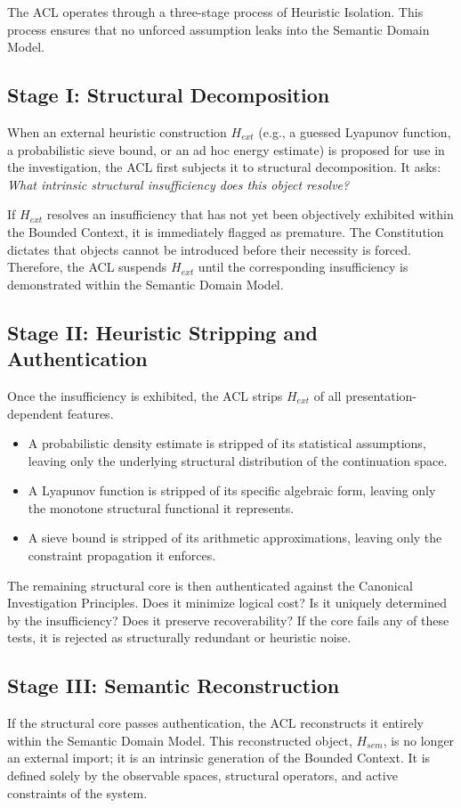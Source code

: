 \documentclass[12pt,openany]{extbook}
\theoremstyle{plain}
\theoremstyle{definition}
\begin{document}
The ACL operates through a three-stage process of Heuristic Isolation. This process ensures that no unforced assumption leaks into the Semantic Domain Model.

\subsection{Stage I: Structural Decomposition}
When an external heuristic construction $H_{ext}$ (e.g., a guessed Lyapunov function, a probabilistic sieve bound, or an ad hoc energy estimate) is proposed for use in the investigation, the ACL first subjects it to structural decomposition. It asks: \emph{What intrinsic structural insufficiency does this object resolve?}

If $H_{ext}$ resolves an insufficiency that has not yet been objectively exhibited within the Bounded Context, it is immediately flagged as premature. The Constitution dictates that objects cannot be introduced before their necessity is forced. Therefore, the ACL suspends $H_{ext}$ until the corresponding insufficiency is demonstrated within the Semantic Domain Model.

\subsection{Stage II: Heuristic Stripping and Authentication}
Once the insufficiency is exhibited, the ACL strips $H_{ext}$ of all presentation-dependent features. 
\begin{itemize}
    \item A probabilistic density estimate is stripped of its statistical assumptions, leaving only the underlying structural distribution of the continuation space.
    \item A Lyapunov function is stripped of its specific algebraic form, leaving only the monotone structural functional it represents.
    \item A sieve bound is stripped of its arithmetic approximations, leaving only the constraint propagation it enforces.
\end{itemize}

The remaining structural core is then authenticated against the Canonical Investigation Principles. Does it minimize logical cost? Is it uniquely determined by the insufficiency? Does it preserve recoverability? If the core fails any of these tests, it is rejected as structurally redundant or heuristic noise.

\subsection{Stage III: Semantic Reconstruction}
If the structural core passes authentication, the ACL reconstructs it entirely within the Semantic Domain Model. This reconstructed object, $H_{sem}$, is no longer an external import; it is an intrinsic generation of the Bounded Context. It is defined solely by the observable spaces, structural operators, and active constraints of the system.
\end{document}
